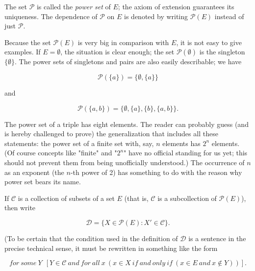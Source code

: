 The set $ \mathcal{P} $ is called the \textit{power set} of $E$; the axiom of extension guarantees its uniqueness. The dependence of $ \mathcal{P} $ on $E$ is denoted by writing $ \mathcal{P} (E) $ instead of just $ \mathcal{P} $.

Because the set $ \mathcal{P} (E) $ is very big in comparison with $E$, it is not easy to give examples. If $E = \emptyset $, the situation is clear enough; the set $ \mathcal{P} ( \emptyset ) $ is the singleton $\{ \emptyset \}$. The power sets of singletons and pairs are also easily describable; we have 

\begin{equation*}
\mathcal{P} ( \{ a \} ) = \{ \emptyset, \{ a \} \} 
\end{equation*}

and 

\begin{equation*}
\mathcal{P} ( \{ a, b \} ) = \{ \emptyset, \{ a \} , \{ b \} , \{ a,b \} \} .
\end{equation*}

The power set of a triple has eight elements. The reader can probably guess (and is hereby challenged to prove) the generalization that includes all these statements: the power set of a finite set with, say, $n$ elements has $2^{n}$ elements. (Of course concepts like "finite" and "$2^{n}$" have no official standing for us yet; this should not prevent them from being unofficially understood.) The occurrence of $n$ as an exponent (the $n$-th power of 2) has something to do with the reason why power set bears its name. 

If $ \mathcal{C} $ is a collection of subsets of a set $E$ (that is, $ \mathcal{C} $ is a subcollection of $ \mathcal{P} (E) $), then write

\begin{equation*}
\mathcal{D} = \{ X \in \mathcal{P} (E): X' \in \mathcal{C} \} .
\end{equation*}

(To be certain that the condition used in the definition of $ \mathcal{D} $ is a sentence in the precise technical sense, it must be rewritten in something like the form 

\begin{equation*}
for \: some \: Y \:\ [ Y \in \mathcal{C} \: and \: for \: all \: x\ ( x \in X \: if \: and \: only \: if \: (x \in E \: and \: x \notin Y)) ] .  
\end{equation*}

